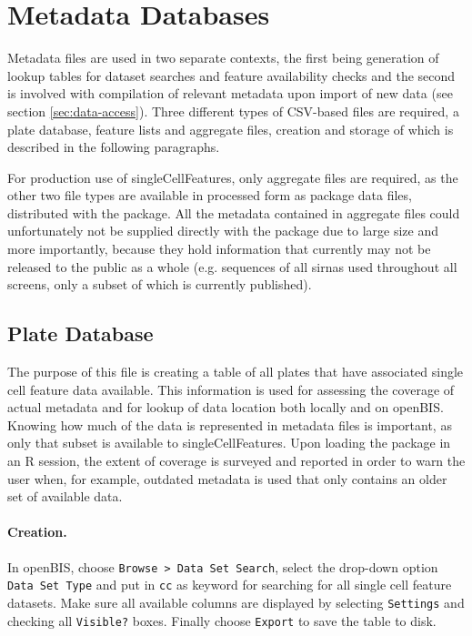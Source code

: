 \section{Metadata Databases}
\label{sec:update-metadata}
Metadata files are used in two separate contexts, the first being generation of lookup tables for dataset searches and feature availability checks and the second is involved with compilation of relevant metadata upon import of new data (see section \ref{sec:data-access}). Three different types of CSV-based files are required, a plate database, feature lists and aggregate files, creation and storage of which is described in the following paragraphs.

For production use of singleCellFeatures, only aggregate files are required, as the other two file types are available in processed form as package data files, distributed with the package. All the metadata contained in aggregate files could unfortunately not be supplied directly with the package due to large size and more importantly, because they hold information that currently may not be released to the public as a whole (e.g. sequences of all \glspl{sirna} used throughout all screens, only a subset of which is currently published).

\subsection{Plate Database}
\label{sec:plate-database}
The purpose of this file is creating a table of all plates that have associated single cell feature data available. This information is used for assessing the coverage of actual metadata and for lookup of data location both locally and on openBIS. Knowing how much of the data is represented in metadata files is important, as only that subset is available to singleCellFeatures. Upon loading the package in an R session, the extent of coverage is surveyed and reported in order to warn the user when, for example, outdated metadata is used that only contains an older set of available data.

\paragraph{Creation.}
In openBIS, choose \texttt{Browse > Data Set Search}, select the drop-down option \texttt{Data Set Type} and put in \texttt{cc} as keyword for searching for all single cell feature datasets. Make sure all available columns are displayed by selecting \texttt{Settings} and checking all \texttt{Visible?} boxes. Finally choose \texttt{Export} to save the table to disk.

